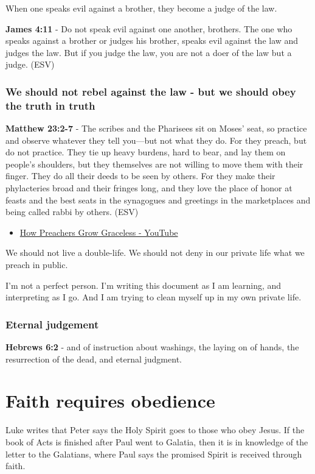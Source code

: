 \documentclass[11pt]{article}
\begin{document}
When one speaks evil against a brother, they become a judge of the law.

\textbf{James 4:11} - Do not speak evil against one another, brothers. The one who speaks against a brother or judges his brother, speaks evil against the law and judges the law. But if you judge the law, you are not a doer of the law but a judge. (ESV)

\subsubsection{We should not rebel against the law - but we should obey the truth in truth}
\label{sec:orgd17b891}
\textbf{Matthew 23:2-7} - The scribes and the Pharisees sit on Moses' seat, so practice and observe whatever they tell you—but not what they do. For they preach, but do not practice. They tie up heavy burdens, hard to bear, and lay them on people's shoulders, but they themselves are not willing to move them with their finger. They do all their deeds to be seen by others. For they make their phylacteries broad and their fringes long, and they love the place of honor at feasts and the best seats in the synagogues and greetings in the marketplaces and being called rabbi by others. (ESV)

\begin{itemize}
\item \href{https://www.youtube.com/watch?v=alOI2zxIPgc}{How Preachers Grow Graceless - YouTube}
\end{itemize}

We should not live a double-life.
We should not deny in our private life what we preach in public.

I'm not a perfect person. I'm writing this document as I am learning, and interpreting as I go.
And I am trying to clean myself up in my own private life.

\subsubsection{Eternal judgement}
\label{sec:org36919b5}
\textbf{Hebrews 6:2} - and of instruction about washings, the laying on of hands, the resurrection of the dead, and eternal judgment.

\section{Faith requires obedience}
\label{sec:org4d574cb}
Luke writes that Peter says the Holy Spirit goes to those who obey Jesus.
If the book of Acts is finished after Paul went to Galatia, then it is in knowledge of the letter to the Galatians, where Paul says the promised Spirit is received through faith.
\end{document}
